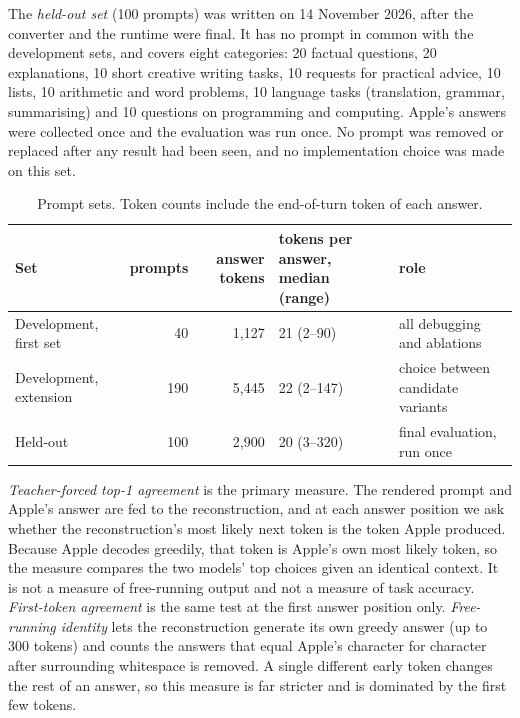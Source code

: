 \documentclass[11pt,reqno]{amsart}
\makeatletter
\renewcommand\paragraph{\@startsection{paragraph}{4}\z@{.6\linespacing\@plus.2\linespacing}{-\fontdimen2\font}{\normalfont\bfseries}}
\theoremstyle{definition}
\makeatother
\begin{document}
The \emph{held-out set} (100 prompts) was written on 14 November 2026, after the converter and the runtime were final. It has no prompt in common with the development sets, and covers eight categories: 20 factual questions, 20 explanations, 10 short creative writing tasks, 10 requests for practical advice, 10 lists, 10 arithmetic and word problems, 10 language tasks (translation, grammar, summarising) and 10 questions on programming and computing. Apple's answers were collected once and the evaluation was run once. No prompt was removed or replaced after any result had been seen, and no implementation choice was made on this set.

\begin{table}[!htbp]
\centering\small
\begin{tabular}{@{}p{42mm}rrp{22mm}p{52mm}@{}}
\toprule
Set & prompts & answer tokens & tokens per answer, median (range) & role \\
\midrule
Development, first set & 40 & 1{,}127 & 21 (2--90) & all debugging and ablations \\
Development, extension & 190 & 5{,}445 & 22 (2--147) & choice between candidate variants \\
Held-out & 100 & 2{,}900 & 20 (3--320) & final evaluation, run once \\
\bottomrule
\end{tabular}
\caption{Prompt sets. Token counts include the end-of-turn token of each answer.}\label{tab:promptsets}
\end{table}

\paragraph{Metrics.} \emph{Teacher-forced top-1 agreement} is the primary measure. The rendered prompt and Apple's answer are fed to the reconstruction, and at each answer position we ask whether the reconstruction's most likely next token is the token Apple produced. Because Apple decodes greedily, that token is Apple's own most likely token, so the measure compares the two models' top choices given an identical context. It is not a measure of free-running output and not a measure of task accuracy. \emph{First-token agreement} is the same test at the first answer position only. \emph{Free-running identity} lets the reconstruction generate its own greedy answer (up to 300 tokens) and counts the answers that equal Apple's character for character after surrounding whitespace is removed. A single different early token changes the rest of an answer, so this measure is far stricter and is dominated by the first few tokens.
\end{document}
